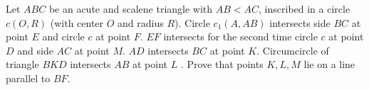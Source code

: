 Let $ABC$ be an acute and scalene triangle with $AB<AC$, inscribed in a circle $c(O,R)$ (with center $O$ and radius $R$). Circle $c_1(A,AB)$ intersects side $BC$ at point $E$ and circle $c$ at point $F$. $EF$ intersects for the second time circle $c$ at point $D$ and side $AC$ at point $M$. $AD$ intersects $BC$ at point $K$. Circumcircle of triangle $BKD$ intersects $AB$ at point $L$ . Prove that points $K,L,M$ lie on a line parallel to $BF$.